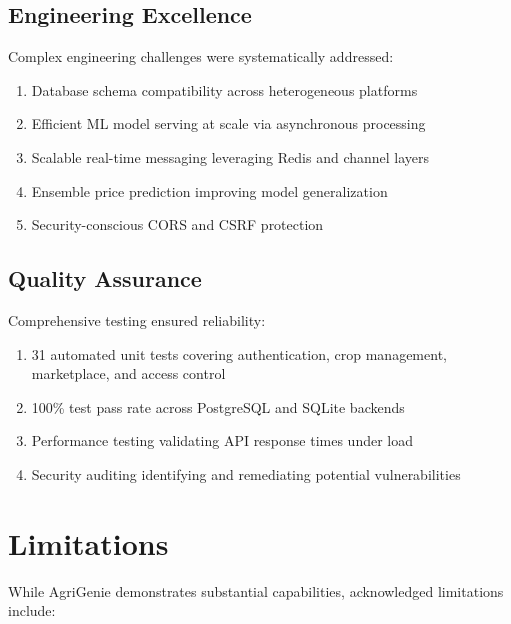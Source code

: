 \documentclass[12pt,a4paper]{report}
\begin{document}
\subsection{Engineering Excellence}

Complex engineering challenges were systematically addressed:
\begin{enumerate}
    \item Database schema compatibility across heterogeneous platforms
    \item Efficient ML model serving at scale via asynchronous processing
    \item Scalable real-time messaging leveraging Redis and channel layers
    \item Ensemble price prediction improving model generalization
    \item Security-conscious CORS and CSRF protection
\end{enumerate}

\subsection{Quality Assurance}

Comprehensive testing ensured reliability:
\begin{enumerate}
    \item 31 automated unit tests covering authentication, crop management, marketplace, and access control
    \item 100\% test pass rate across PostgreSQL and SQLite backends
    \item Performance testing validating API response times under load
    \item Security auditing identifying and remediating potential vulnerabilities
\end{enumerate}

\section{Limitations}

While AgriGenie demonstrates substantial capabilities, acknowledged limitations include:
\end{document}
